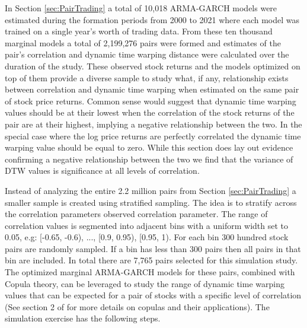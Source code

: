 In Section \ref{sec:PairTrading} a total of 10,018 ARMA-GARCH models were estimated during the formation periods from 2000 to 2021 where each model was trained on a single year's worth of trading data. From these ten thousand marginal models a total of 2,199,276 pairs were formed and estimates of the pair's correlation and dynamic time warping distance were calculated over the duration of the study. These observed stock returns and the models optimized on top of them provide a diverse sample to study what, if any, relationship exists between correlation and dynamic time warping when estimated on the same pair of stock price returns. Common sense would suggest that dynamic time warping values should be at their lowest when the correlation of the stock returns of the pair are at their highest, implying a negative relationship between the two. In the special case where the log price returns are perfectly correlated the dynamic time warping value should be equal to zero. While this section does lay out evidence confirming a negative relationship between the two we find that the variance of DTW values is significance at all levels of correlation. 

Instead of analyzing the entire 2.2 million pairs from Section \ref{sec:PairTrading} a smaller sample is created using stratified sampling. The idea is to stratify across the correlation parameters observed correlation parameter. The range of correlation values is segmented into adjacent bins with a uniform width set to 0.05, e.g: [-0.65, -0.6), ..., [0.9, 0.95), [0.95, 1). For each bin 300 hundred stock pairs are randomly sampled. If a bin has less than 300 pairs then all pairs in that bin are included. In total there are 7,765 pairs selected for this simulation study. The optimized marginal ARMA-GARCH models for these pairs, combined with Copula theory, can be leveraged to study the range of dynamic time warping values that can be expected for a pair of stocks with a specific level of correlation (See section 2 of \cite{DowiakTV-COP} for more details on copulas and their applications). The simulation exercise has the following steps.


